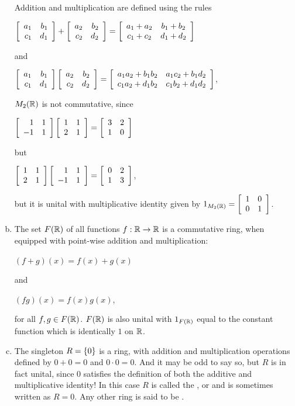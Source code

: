 \documentclass[11pt,fleqn,dvipsnames,usenames]{article}
\newcommand{\p}{\noindent}
\begin{document}
\begin{examples}
\begin{enumerate}[(a)]
\p Addition and multiplication are defined using the rules
\begin{center}
$\MATRIX{rr}{a_1 & b_1\\c_1 & d_1} + \MATRIX{rr}{a_2 & b_2\\c_2 & d_2} = \MATRIX{cc}{a_1 + a_2 & b_1 + b_2\\c_1 + c_2& d_1 + d_2}$
\end{center}
and
\begin{center}
$\MATRIX{rr}{a_1 & b_1\\c_1 & d_1}\MATRIX{rr}{a_2 & b_2\\c_2 & d_2} = \MATRIX{cc}{a_1a_2 + b_1b_2 & a_1c_2 + b_1d_2\\c_1a_2 + d_1b_2 & c_1b_2 + d_1d_2}$,
\end{center}
\p $M_{2}(\REAL)$ is not commutative, since
\begin{center}
$\MATRIX{rr}{1 & 1\\-1 & 1}\MATRIX{rr}{1 & 1\\2 & 1} = \MATRIX{rr}{3 & 2\\1 & 0}$
\end{center}
but
\begin{center}
$\MATRIX{rr}{1 & 1\\2 & 1}\MATRIX{rr}{1 & 1\\-1 & 1} = \MATRIX{rr}{0 & 2\\ 1 & 3}$,
\end{center}
\p but it is unital with multiplicative identity given by $1_{M_{2}(\REAL)} = \MATRIX{rr}{1 & 0\\0 & 1}$.
\item The set $F(\REAL)$ of all functions $f:\REAL\to\REAL$ is a commutative ring, when equipped with point-wise addition and multiplication:
\begin{center}
$(f+g)(x) = f(x) + g(x)$
\end{center}
and
\begin{center}
$(fg)(x) = f(x)g(x)$,
\end{center}
for all $f,g\in F(\REAL)$.  $F(\REAL)$ is also unital with $1_{F(\REAL)}$ equal to the constant function which is identically $1$ on $\REAL$.
\item The singleton $R = \SET{0}$ is a ring, with addition and multiplication operations defined by $0 + 0 = 0$ and $0\cdot 0 = 0$.  And it may be odd to say so, but $R$ is in fact unital, since $0$ satisfies the definition of both the additive and multiplicative identity!  In this case $R$ is called the , or  and is sometimes written as $R = 0$.  Any other ring is said to be .
\end{enumerate}
\end{examples}
\end{document}
